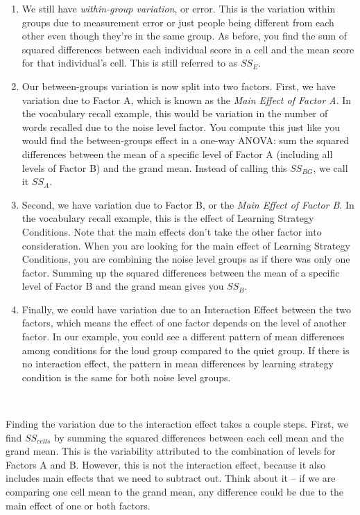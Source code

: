 \documentclass[
  letterpaper,
  DIV=11,
  numbers=noendperiod]{scrreprt}
\begin{document}
\begin{enumerate}
\def\labelenumi{\arabic{enumi}.}
\item
  We still have \emph{within-group variation}, or error. This is the
  variation within groups due to measurement error or just people being
  different from each other even though they're in the same group. As
  before, you find the sum of squared differences between each
  individual score in a cell and the mean score for that individual's
  cell. This is still referred to as \(SS_E\).
\item
  Our between-groups variation is now split into two factors. First, we
  have variation due to Factor A, which is known as the \emph{Main
  Effect of Factor A}. In the vocabulary recall example, this would be
  variation in the number of words recalled due to the noise level
  factor. You compute this just like you would find the between-groups
  effect in a one-way ANOVA: sum the squared differences between the
  mean of a specific level of Factor A (including all levels of Factor
  B) and the grand mean. Instead of calling this \(SS_{BG}\), we call it
  \(SS_A\).
\item
  Second, we have variation due to Factor B, or the \emph{Main Effect of
  Factor B}. In the vocabulary recall example, this is the effect of
  Learning Strategy Conditions. Note that the main effects don't take
  the other factor into consideration. When you are looking for the main
  effect of Learning Strategy Conditions, you are combining the noise
  level groups as if there was only one factor. Summing up the squared
  differences between the mean of a specific level of Factor B and the
  grand mean gives you \(SS_B\).
\item
  Finally, we could have variation due to an Interaction Effect between
  the two factors, which means the effect of one factor depends on the
  level of another factor. In our example, you could see a different
  pattern of mean differences among conditions for the loud group
  compared to the quiet group. If there is no interaction effect, the
  pattern in mean differences by learning strategy condition is the same
  for both noise level groups.\,\,
\end{enumerate}

\,

Finding the variation due to the interaction effect takes a couple
steps. First, we find \(SS_{cells}\) by summing the squared differences
between each cell mean and the grand mean. This is the variability
attributed to the combination of levels for Factors A and B. However,
this is not the interaction effect, because it also includes main
effects that we need to subtract out. Think about it -- if we are
comparing one cell mean to the grand mean, any difference could be due
to the main effect of one or both factors.\,\,
\end{document}

